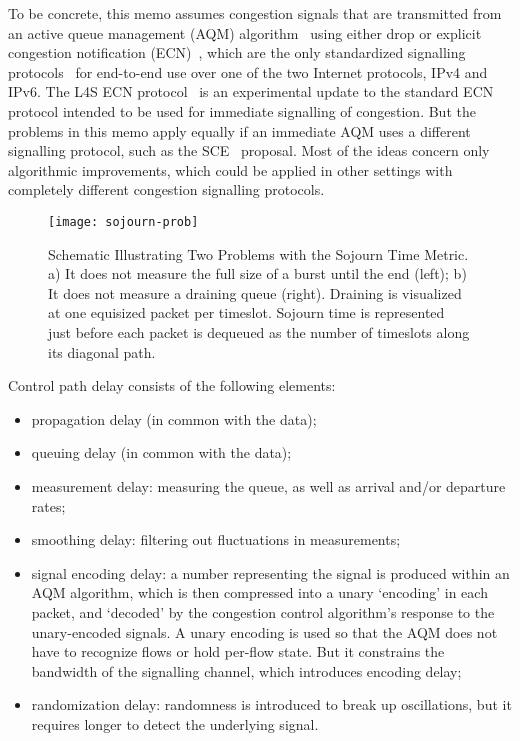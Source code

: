 To be concrete, this memo assumes congestion signals that are transmitted from an active queue management (AQM) algorithm~\cite{Adams13:AQM_survey} using either drop or explicit congestion notification (ECN)~\cite{Floyd94:ECN}, which are the only standardized signalling protocols~\cite{IETF_RFC3168:ECN_IP_TCP} for end-to-end use over one of the two Internet protocols, IPv4 and IPv6. The L4S ECN protocol~\cite{Briscoe15f:ecn-l4s-id_ID} is an experimental update to the standard ECN protocol intended to be used for immediate signalling of congestion. But the problems in this memo apply equally if an immediate AQM uses a different signalling protocol, such as the SCE~\cite{Morton19:SCE_ID} proposal. Most of the ideas concern only algorithmic improvements, which could be applied in other settings with completely different congestion signalling protocols.

\begin{figure*}
	\centering
	\texttt{[image: sojourn-prob]}
	\caption{Schematic Illustrating Two Problems with the Sojourn Time Metric. a) It does not measure the full size of a burst until the end (left); b) It does not measure a draining queue (right). Draining is visualized at one equisized packet per timeslot. Sojourn time is represented just before each packet is dequeued as the number of timeslots along its diagonal path.}\label{fig:sojourn-prob}
\end{figure*}

Control path delay consists of the following elements:
\begin{itemize}[nosep]
	\item propagation delay (in common with the data);
	\item queuing delay (in common with the data);
	\item measurement delay: measuring the queue, as well as arrival and/or departure rates;
	\item smoothing delay: filtering out fluctuations in measurements;
	\item signal encoding delay: a number representing the signal is produced within an AQM algorithm, which is then compressed into a unary `encoding' in each packet, and `decoded' by the congestion control algorithm's response to the unary-encoded signals. A unary encoding is used so that the AQM does not have to recognize flows or hold per-flow state. But it constrains the bandwidth of the signalling channel, which introduces encoding delay;
	\item randomization delay: randomness is introduced to break up oscillations, but it requires longer to detect the underlying signal.
\end{itemize}

